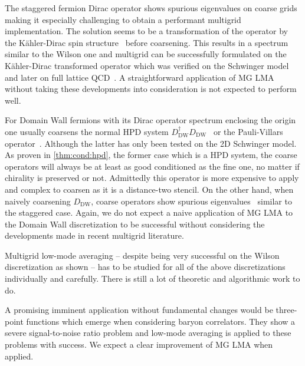 The staggered fermion Dirac operator shows spurious eigenvalues on coarse grids~\cite{Brower:2018ymy} making it especially challenging to obtain a performant multigrid implementation.
The solution seems to be a transformation of the operator by the Kähler-Dirac spin structure~\cite{Becher:1982ud,Bodwin:1987ah} before coarsening.
This results in a spectrum similar to the Wilson one and multigrid can be successfully formulated on the Kähler-Dirac transformed operator which was verified on the Schwinger model~\cite{Brower:2018ymy} and later on full lattice QCD~\cite{Ayyar:2022krp}.
A straightforward application of MG LMA without taking these developments into consideration is not expected to perform well.

For Domain Wall fermions with its Dirac operator spectrum enclosing the origin one usually coarsens the normal HPD system $D_{\text{DW}}^{\dagger} D_{\text{DW}}$~\cite{Cohen:2011ivh,Boyle:2014rwa} or the Pauli-Villars operator~\cite{Brower:2020xmc}.
Although the latter has only been tested on the 2D Schwinger model.
As proven in \cref{thm:cond:hpd}, the former case which is a HPD system, the coarse operators will always be at least as good conditioned as the fine one, no matter if chirality is preserved or not.
Admittedly this operator is more expensive to apply and complex to coarsen as it is a distance-two stencil.
On the other hand, when naively coarsening $D_{\text{DW}}$, coarse operators show spurious eigenvalues~\cite{Brower:2020xmc} similar to the staggered case.
Again, we do not expect a naive application of MG LMA to the Domain Wall discretization to be successful without considering the developments made in recent multigrid literature.

Multigrid low-mode averaging -- despite being very successful on the Wilson discretization as shown -- has to be studied for all of the above discretizations individually and carefully.
There is still a lot of theoretic and algorithmic work to do.

A promising imminent application without fundamental changes would be three-point functions which emerge when considering baryon correlators.
They show a severe signal-to-noise ratio problem and low-mode averaging is applied to these problems with success.
We expect a clear improvement of MG LMA when applied.


